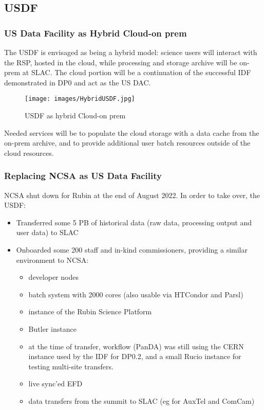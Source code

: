  
 \subsection{USDF}

\subsubsection{US Data Facility as Hybrid Cloud-on prem}

 The USDF is envisaged as being a hybrid model: science users will
interact with the RSP, hosted in the cloud, while processing and
storage archive will be on-prem at SLAC. The cloud portion  will be a
continuation of the successful IDF demonstrated in DP0 and act as the
US DAC.

\begin{figure}
\begin{centering}
\texttt{[image: images/HybridUSDF.jpg]}
	\caption{USDF as hybrid Cloud-on prem\label{fig:HybridUSDF}}
\end{centering}
\end{figure}

Needed services will be to populate the cloud storage with a data
cache from the on-prem archive, and to provide additional user batch
resources outside of the cloud resources.
 
 
\subsubsection{Replacing NCSA as US Data Facility}

NCSA shut down for Rubin at the end of August 2022. In order to take
over, the USDF:
\begin{itemize}
\item Transferred some 5 PB of historical data (raw data, processing
output and user data) to SLAC
\item Onboarded some 200 staff and in-kind commissioners, providing a
similar environment to NCSA:
\begin{itemize}
\item developer nodes
\item batch system with 2000 cores (also usable via HTCondor and Parsl)
\item instance of the Rubin Science Platform
\item Butler instance
\item at the time of transfer, workflow (PanDA) was still using the
CERN instance used by the IDF for DP0.2, and a small Rucio instance
for testing multi-site transfers.
\item live sync'ed EFD
\item data transfers from the summit to SLAC (eg for AuxTel and ComCam)
\end{itemize}
\end{itemize}

